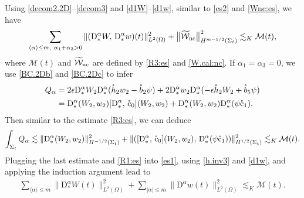 \documentclass[twoside,11pt]{article}
\numberwithin{equation}{section}
\begin{document}
Using \eqref{decom2.2D}--\eqref{decom3} and \eqref{d1W}--\eqref{d1w}, similar to \eqref{es2} and \eqref{Wnc:es}, we have
\begin{align}
	\sum_{\langle \alpha\rangle \leq m,\
		\alpha_1+\alpha_3>0}	\|(\mathrm{D}_*^{\alpha}W,\, \mathrm{D}_*^{\alpha}w)(t)\|_{L^2(\Omega)}^2
		+	\big\| \widetilde{\mathcal{W}}_{\rm nc} \big\|_{H^{m-1/2}(\Sigma_t)}^2
	\lesssim_K  \mathcal{M}(t),
	\label{es:nor2D}
\end{align}
where $\mathcal{M}(t)$ and $\widetilde{\mathcal{W}}_{\rm nc}$ are defined by \eqref{R3:es} and \eqref{W.cal:nc}.
 	 If $\alpha_1=\alpha_3=0$, we use \eqref{BC.2Db} and \eqref{BC.2Dc} to infer
	\begin{align}\nonumber
		Q_{\alpha} =\; &2 \epsilon \mathrm{D}_*^{\alpha} W_2 \mathrm{D}_*^{\alpha}(\mathring{h}_2w_2-\mathring{b}_2 \psi )
		+2\mathrm{D}_*^{\alpha}w_2 \mathrm{D}_*^{\alpha}(-\epsilon \mathring{h}_2 W_2+\mathring{b}_5 \psi) \\[0.5mm]
		=\; &  \mathrm{D}_*^{\alpha} (W_2, w_2)[\mathrm{D}_*^{\alpha}, \, \mathring{\rm c}_0](W_2, w_2) +\mathrm{D}_*^{\alpha} (W_2, w_2)\mathrm{D}_*^{\alpha} ( \psi\mathring{\rm c}_1).
		\label{Q.alpha:id}
	\end{align}
Then similar to the estimate \eqref{R3:es}, we can deduce
	\begin{align} \nonumber
		\int_{\Sigma_t}{Q}_{\alpha}
		 \lesssim  \|\mathrm{D}_*^{\alpha}(W_2,w_2)\|_{H^{-1/2}(\Sigma_t)}^2 + \|([\mathrm{D}_*^{\alpha},\, \mathring{\rm c}_0](W_2,w_2),\, \mathrm{D}_*^{\alpha} (\psi \mathring{\rm c}_1 )) \|_{H^{1/2}(\Sigma_t)}^2   \lesssim_K  \mathcal{M}(t). \nonumber %
	\end{align}
Plugging the last estimate and \eqref{R1:es} into \eqref{es1}, using
\eqref{h.inv3} and \eqref{d1w}, and applying the induction argument  lead to
\begin{align}\label{es:H1}
	\sum_{\langle \alpha\rangle \leq m}	\| \mathrm{D}_*^{\alpha}W(t)\|_{L^2(\Omega)}^2
	+	\sum_{|\alpha| \leq m}	\|  \mathrm{D}^{\alpha}w(t)\|_{ L^2(\Omega)}^2
	\lesssim_K  \mathcal{M}(t).
\end{align}
\end{document}
